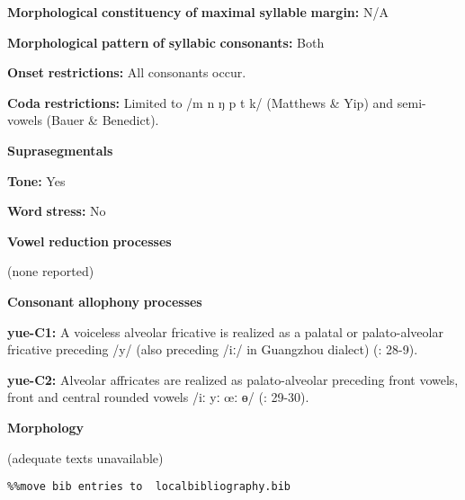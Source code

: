 \begin{styleBody}
\textbf{Morphological} \textbf{constituency} \textbf{of} \textbf{maximal} \textbf{syllable} \textbf{margin:} N/A

\textbf{Morphological} \textbf{pattern} \textbf{of} \textbf{syllabic} \textbf{consonants:} Both

\textbf{Onset} \textbf{restrictions:} All consonants occur.

\textbf{Coda} \textbf{restrictions:} Limited to /m n ŋ p t k/ (Matthews \& Yip) and semi-vowels (Bauer \& Benedict).

\textbf{Suprasegmentals}

\textbf{Tone:} Yes

\textbf{Word} \textbf{stress:} No

\textbf{Vowel} \textbf{reduction} \textbf{processes}

(none reported)

\textbf{Consonant} \textbf{allophony} \textbf{processes}

\textbf{yue-C1:} A voiceless alveolar fricative is realized as a palatal or palato-alveolar fricative preceding /y/ (also preceding /iː/ in Guangzhou dialect) (\citealt{BauerBenedict1997}: 28-9).

\textbf{yue-C2:} Alveolar affricates are realized as palato-alveolar preceding front vowels, front and central rounded vowels /iː yː œː ɵ/ (\citealt{BauerBenedict1997}: 29-30).

\textbf{Morphology}

(adequate texts unavailable)
\end{styleBody}

\begin{verbatim}%%move bib entries to  localbibliography.bib
\end{verbatim} 
